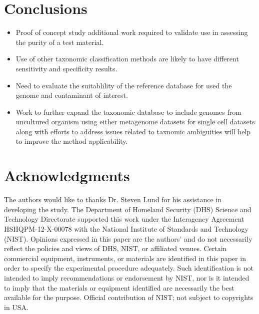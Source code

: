 \documentclass[fleqn,10pt,lineno]{wlpeerj}\usepackage[]{graphicx}\usepackage[]{color}
\begin{document}
\section*{Conclusions}  
\begin{itemize}
      \item Proof of concept study additional work required to validate use in assessing the purity of a test material.  
      \item Use of other taxonomic classification methods are likely to have different sensitivity and specificity results.
      \item Need to evaluate the suitablility of the reference database for used the genome and contaminant of interest.
      \item Work to further expand the taxonomic database to include genomes from uncultured organism using either metagenome datasets for single cell datasets along with efforts to address issues related to taxnomic ambiguities will help to improve the method applicability. 
\end{itemize}

\newpage

\section*{Acknowledgments}

The authors would like to thanks Dr. Steven Lund for his assistance in developing the study. 
The Department of Homeland Security (DHS) Science and Technology Directorate supported this work under the Interagency Agreement HSHQPM-12-X-00078 with the National Institute of Standards and Technology (NIST). 
Opinions expressed in this paper are the authors’ and do not necessarily reflect the policies and views of DHS,  NIST, or affiliated venues. 
Certain commercial equipment, instruments, or materials are identified in this paper in order to specify the experimental procedure adequately. 
Such identification is not intended to imply recommendations or endorsement by NIST, 
nor is it intended to imply that the materials or equipment identified are necessarily the best available for the purpose. 
Official contribution of NIST; not subject to copyrights in USA.


\end{document}
